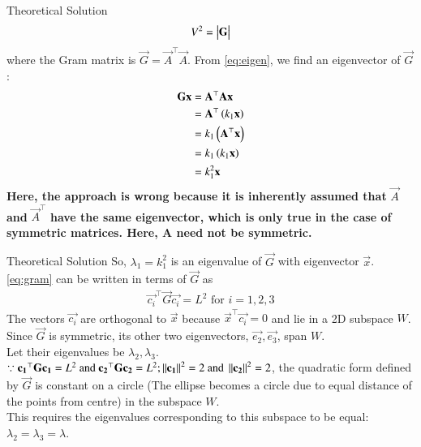 \documentclass{beamer}
\begin{document}
\begin{frame}{Theoretical Solution}
\begin{align}
    V^2 = \begin{vmatrix}\mathbf{G}\end{vmatrix} 
\end{align}
where the Gram matrix is $\vec{G} = \vec{A}^\top\vec{A}$. From \eqref{eq:eigen}, we find an eigenvector of $\vec{G}$:
\begin{align}
    \mathbf{G}\mathbf{x} &= \mathbf{A}^\top\mathbf{A}\mathbf{x} \\
    &= \mathbf{A}^\top\left(k_1\mathbf{x}\right) \\
    &= k_1\left(\mathbf{A}^\top\mathbf{x}\right) \\
    &= k_1\left(k_1\mathbf{x}\right) \\
    &= k_1^2\mathbf{x}
\end{align}
\textbf{Here, the approach is wrong because it is inherently assumed that }$\vec{A}$\textbf{ and }$\vec{A}^\top$\textbf{ have the same eigenvector, which is only true in the case of symmetric matrices. Here, A need not be symmetric.}\\
\end{frame}

\begin{frame}{Theoretical Solution}
So, $\lambda_1 = k_1^2$ is an eigenvalue of $\vec{G}$ with eigenvector $\vec{x}$. \\
\eqref{eq:gram} can be written in terms of $\vec{G}$ as
\begin{align}
    \vec{c_i}^\top \vec{G} \vec{c_i} = L^2 \text{ for } i=1,2,3
\end{align}
The vectors $\vec{c_i}$ are orthogonal to $\vec{x}$ because $\vec{x}^\top\vec{c_i}=0$ and lie in a 2D subspace $W$. \\
Since $\vec{G}$ is symmetric, its other two eigenvectors, $\vec{e_2}, \vec{e_3}$, span $W$. \\
Let their eigenvalues be $\lambda_2, \lambda_3$. \\
$\because \mathbf{c_1}^\top\mathbf{G}\mathbf{c_1} = L^2\text{ and }\mathbf{c_2}^\top\mathbf{G}\mathbf{c_2} = L^2; \left\lVert\mathbf{c_1}\right\rVert^2 = 2\text{ and }\left\lVert\mathbf{c_2}\right\rVert^2 = 2$, the quadratic form defined by $\vec{G}$ is constant on a circle (The ellipse becomes a circle due to equal distance of the points from centre) in the subspace $W$. \\
This requires the eigenvalues corresponding to this subspace to be equal: $\lambda_2 = \lambda_3 = \lambda$.
\end{frame}
\end{document}

